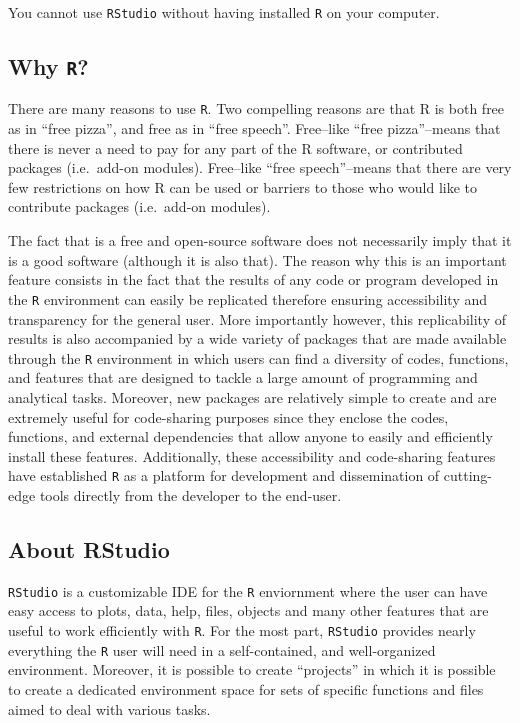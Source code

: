 \documentclass[12pt,]{krantz}
\let\BeginKnitrBlock\begin \let\EndKnitrBlock\end
\begin{document}
\BeginKnitrBlock{rmdimportant}
You cannot use \texttt{RStudio} without having installed \texttt{R} on
your computer.
\EndKnitrBlock{rmdimportant}

\subsection{\texorpdfstring{Why \texttt{R}?}{Why R?}}\label{why-r}

There are many reasons to use \texttt{R}. Two compelling reasons are
that R is both free as in ``free pizza'', and free as in ``free
speech''. Free--like ``free pizza''--means that there is never a need to
pay for any part of the R software, or contributed packages (i.e.~add-on
modules). Free--like ``free speech''--means that there are very few
restrictions on how R can be used or barriers to those who would like to
contribute packages (i.e.~add-on modules).

The fact that is a free and open-source software does not necessarily
imply that it is a good software (although it is also that). The reason
why this is an important feature consists in the fact that the results
of any code or program developed in the \texttt{R} environment can
easily be replicated therefore ensuring accessibility and transparency
for the general user. More importantly however, this replicability of
results is also accompanied by a wide variety of packages that are made
available through the \texttt{R} environment in which users can find a
diversity of codes, functions, and features that are designed to tackle
a large amount of programming and analytical tasks. Moreover, new
packages are relatively simple to create and are extremely useful for
code-sharing purposes since they enclose the codes, functions, and
external dependencies that allow anyone to easily and efficiently
install these features. Additionally, these accessibility and
code-sharing features have established \texttt{R} as a platform for
development and dissemination of cutting-edge tools directly from the
developer to the end-user.

\subsection{About RStudio}\label{about-rstudio}

\texttt{RStudio} is a customizable IDE for the \texttt{R} enviornment
where the user can have easy access to plots, data, help, files, objects
and many other features that are useful to work efficiently with
\texttt{R}. For the most part, \texttt{RStudio} provides nearly
everything the \texttt{R} user will need in a self-contained, and
well-organized environment. Moreover, it is possible to create
``projects'' in which it is possible to create a dedicated environment
space for sets of specific functions and files aimed to deal with
various tasks.
\end{document}
